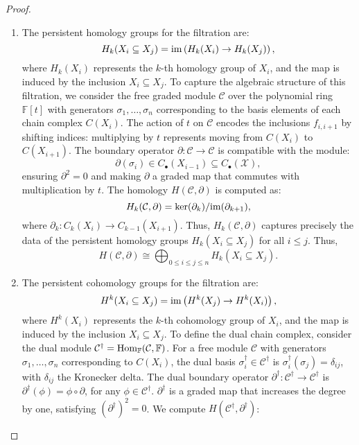 \begin{proof}
\begin{enumerate}
\item The persistent homology groups for the filtration are:
\[
H_k(X_i \subseteq X_j) = \mathrm{im}\left( H_k(X_i) \to H_k(X_j) \right),
\]
where \( H_k(X_i) \) represents the \( k \)-th homology group of \( X_i \), and the map is induced by the inclusion \( X_i \subseteq X_j \). To capture the algebraic structure of this filtration, we consider the free graded module \( \mathcal{C} \) over the polynomial ring \( \mathbb{F}[t] \) with generators \( \sigma_1, \ldots, \sigma_n \) corresponding to the basis elements of each chain complex \( C(X_i) \). The action of \( t \) on \( \mathcal{C} \) encodes the inclusions \( f_{i,i+1} \) by shifting indices: multiplying by \( t \) represents moving from \( C(X_i) \) to \( C(X_{i+1}) \). The boundary operator \( \partial: \mathcal{C} \to \mathcal{C} \) is compatible with the module:
\[
\partial(\sigma_i) \in C_{\bullet}(X_{i-1}) \subseteq C_{\bullet}(\mathcal{X}),
\]
ensuring \( \partial^2 = 0 \) and making \( \partial \) a graded map that commutes with multiplication by \( t \). The homology \( H(\mathcal{C}, \partial) \) is computed as:
\[
H_k(\mathcal{C}, \partial) = \ker(\partial_k) / \mathrm{im}(\partial_{k+1}),
\]
where \( \partial_k: C_k(X_i) \to C_{k-1}(X_{i+1}) \). Thus, \( H_k(\mathcal{C}, \partial) \) captures precisely the data of the persistent homology groups \( H_k(X_i \subseteq X_j) \) for all \( i \leq j \). Thus,
\[
H(\mathcal{C}, \partial) \cong \bigoplus_{0 \leq i \leq j \leq n} H_k(X_i \subseteq X_j).
\]
\item The persistent cohomology groups for the filtration are:
\[
H^k(X_i \subseteq X_j) = \mathrm{im}\left( H^k(X_j) \to H^k(X_i) \right),
\]
where \( H^k(X_i) \) represents the \( k \)-th cohomology group of \( X_i \), and the map is induced by the inclusion \( X_i \subseteq X_j \). To define the dual chain complex, consider the dual module \( \mathcal{C}^\dagger = {\mathrm{Hom}}_{\mathbb{F}}(\mathcal{C}, {\mathbb{F}}) \). For a free module \( \mathcal{C} \) with generators \( \sigma_1, \ldots, \sigma_n \) corresponding to \( C(X_i) \), the dual basis \( \sigma_i^\dagger \in \mathcal{C}^\dagger \) is $\sigma_i^\dagger(\sigma_j) = \delta_{ij}$, with \( \delta_{ij} \) the Kronecker delta. The dual boundary operator \( \partial^\dagger: \mathcal{C}^\dagger \to \mathcal{C}^\dagger \) is $\partial^\dagger(\phi) = \phi \circ \partial$, for any \( \phi \in \mathcal{C}^\dagger \). \( \partial^\dagger \) is a graded map that increases the degree by one, satisfying \( (\partial^\dagger)^2 = 0 \). We compute \( H(\mathcal{C}^\dagger, \partial^\dagger) \):

\end{enumerate}
\end{proof}
